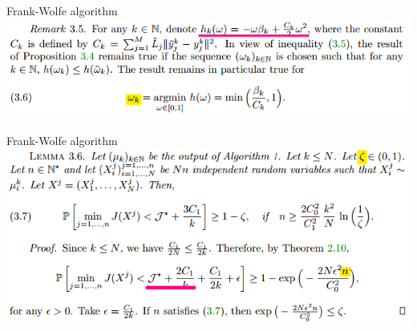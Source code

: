 \documentclass{beamer}
\begin{document}
\begin{frame}{Frank-Wolfe algorithm}
	\includegraphics[width=\textwidth]{kde/13.png}
\end{frame}

\begin{frame}{{Frank-Wolfe algorithm}}
	\includegraphics[width=\textwidth]{kde/12.png}
\end{frame}
\end{document}
